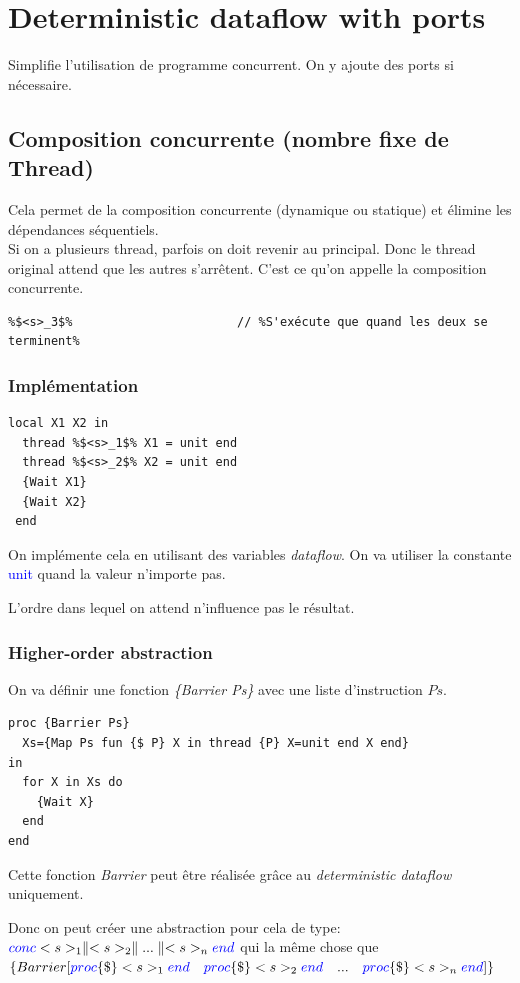\documentclass{report}
\begin{document}
\section{Deterministic dataflow with ports}
Simplifie l'utilisation de programme concurrent. On y ajoute des ports si nécessaire.

\subsection{Composition concurrente (nombre fixe de Thread)}
Cela permet de la composition concurrente (dynamique ou statique) et élimine les dépendances séquentiels.\\
Si on a plusieurs thread, parfois on doit revenir au principal. Donc le thread original attend que les autres s'arrêtent. C'est ce qu'on appelle la composition concurrente.
\begin{lstlisting}[escapechar=\%]
%$(<s>_1 \parallel <s>_2)$%  	 // %Crée deux threads et attend que les deux se terminent%
%$<s>_3$%						// %S'exécute que quand les deux se terminent%
\end{lstlisting}

\subsubsection{Implémentation}
\begin{lstlisting}[escapechar=\%]
local X1 X2 in
  thread %$<s>_1$% X1 = unit end
  thread %$<s>_2$% X2 = unit end
  {Wait X1}
  {Wait X2}
 end
\end{lstlisting}
On implémente cela en utilisant des variables \textit{dataflow}. On va utiliser la constante \textcolor{blue}{unit} quand la valeur n'importe pas.\par 
L'ordre dans lequel on attend n'influence pas le résultat.

\subsubsection{Higher-order abstraction}
On va définir une fonction \textit{\{Barrier Ps\}} avec une liste d'instruction $Ps$.
\begin{lstlisting}[escapechar=\%]
proc {Barrier Ps} 
  Xs={Map Ps fun {$ P} X in thread {P} X=unit end X end}
in 
  for X in Xs do 
    {Wait X} 
  end
end
\end{lstlisting}
Cette fonction \textit{Barrier} peut être réalisée grâce au \textit{deterministic dataflow} uniquement.\par 
Donc on peut créer une abstraction pour cela de type: $\textcolor{blue}{conc} <s>_1 \parallel <s>_2 \parallel ... \parallel <s>_n \textcolor{blue}{end}$ qui la même chose que $\{Barrier [\textcolor{blue}{proc} \{\$\} <s>_1 \textcolor{blue}{end} \quad \textcolor{blue}{proc} \{\$\} <s>_2 \textcolor{blue}{end} \quad ... \quad \textcolor{blue}{proc} \{\$\} <s>_n \textcolor{blue}{end} ]\}$
\end{document}
